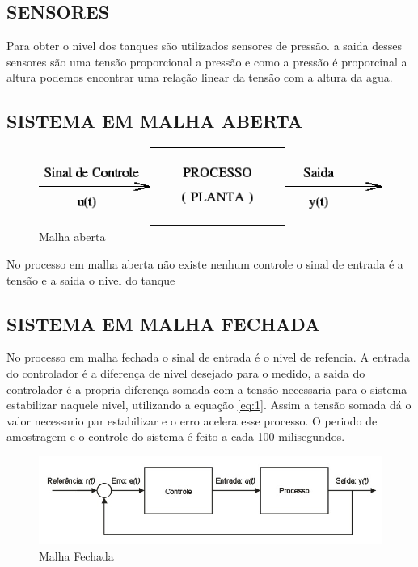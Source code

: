 \documentclass[a4paper,12pt]{article}
\begin{document}
\subsection{SENSORES}
Para obter o nivel dos tanques são utilizados sensores de pressão. a saida desses sensores são uma tensão proporcional a pressão e como a pressão é proporcinal a altura podemos encontrar uma relação linear da tensão com a altura da agua.


\subsection{SISTEMA EM MALHA ABERTA}

\begin{figure}[H]
\includegraphics[width=15cm]{malhaAberta.png}
\caption{Malha aberta}
\label{fig:malhaAberta}
\end{figure}

No processo em malha aberta não existe nenhum controle o sinal de entrada é a tensão e a saida o nivel do tanque


\subsection{SISTEMA EM MALHA FECHADA}

No processo em malha fechada o sinal de entrada é o nivel de refencia.
A entrada do controlador é a diferença de nivel desejado para o medido, a saida do controlador é a propria diferença somada com a tensão necessaria para o sistema estabilizar naquele nivel, utilizando a equação \ref{eq:1}.
Assim a tensão somada dá o valor necessario par estabilizar e o erro acelera esse processo.
O periodo de amostragem e o controle do sistema é feito a cada 100 milisegundos.


\begin{figure}[H]
\includegraphics[width=15cm]{malhaFechada.jpg}
\caption{Malha Fechada}
\label{fig:malhaFechada}
\end{figure}
\end{document}
